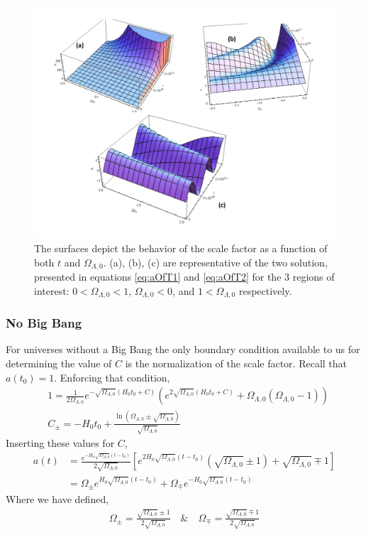\documentclass[twoside]{article}
\begin{document}
\begin{figure}[h!]
  \centering
      \includegraphics[width=1.2\textwidth]{aBigBang.pdf}
  \caption{The surfaces depict the behavior of the scale factor as a function of both $t$ and $\Omega_{\Lambda,0}$. (a), (b), (c) are representative of the two solution, presented in equations \ref{eq:aOfT1} and \ref{eq:aOfT2} for the 3 regions of interest: $0<\Omega_{\Lambda,0}<1$, $\Omega_{\Lambda,0}<0$, and $1<\Omega_{\Lambda,0}$ respectively.}\label{f:aOfTBigbang}
\end{figure}



\subsubsection{No Big Bang}
For universes without a Big Bang the only boundary condition available to us for determining the value of $C$ is the normalization of the scale factor. Recall that $a(t_{0}) = 1$.  Enforcing that condition,
\begin{align}
&1 = \frac{1}{2\Omega_{\Lambda,0}} e^{-\sqrt{\Omega_{\Lambda,0}}(H_{0}t_{0}+C)}\left(e^{2\sqrt{\Omega_{\Lambda,0}}(H_{0}t_{0}+C)}+\Omega_{\Lambda,0}(\Omega_{\Lambda,0}-1)\right)\\
&C_{\pm} = -H_{0}t_{0}+\frac{\ln\left(\Omega_{\Lambda,0}\pm\sqrt{\Omega_{\Lambda,0}}\right)}{\sqrt{\Omega_{\Lambda,0}}}
\end{align}
 Inserting these values for $C$,
\begin{align}
a(t) &= \frac{e^{-H_{0}\sqrt{\Omega_{\Lambda,0}}(t-t_{0})}}{2\sqrt{\Omega_{\Lambda,0}}}\left[e^{2H_{0}\sqrt{\Omega_{\Lambda,0}}(t-t_{0})} \left(\sqrt{\Omega_{\Lambda,0}}\pm 1\right)+\sqrt{\Omega_{\Lambda,0}}\mp 1\right]\\
 &=\Omega_{\pm}e^{H_{0}\sqrt{\Omega_{\Lambda,0}}(t-t_{0})}+\Omega_{\mp}e^{-H_{0}\sqrt{\Omega_{\Lambda,0}}(t-t_{0})}\label{eq:noBig1}
\end{align}
Where we have defined,
\begin{align}
\Omega_{\pm} = \frac{\sqrt{\Omega_{\Lambda,0}}\pm 1}{2\sqrt{\Omega_{\Lambda,0}}}\quad\&\quad \Omega_{\mp} = \frac{\sqrt{\Omega_{\Lambda,0}}\mp 1}{2\sqrt{\Omega_{\Lambda,0}}}
\end{align}
\end{document}
